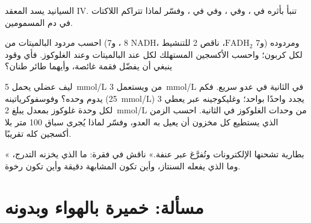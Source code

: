 \begin{exercise}[$\star\star$]\label{exo:b1:respiration-fermentation:9}
السيانيد يسد المعقد IV. تنبأ بأثره في ، وفي ،
وفي  في ، وفسّر لماذا تتراكم اللاكتات في دم
المسمومين.
\end{exercise}

\begin{exercise}[$\star\star\star$]\label{exo:b1:respiration-fermentation:10}
احسب مردود البالميتات من  (8 ، و7 NADH، و7
$\mathrm{FADH_2}$، ناقص 2  للتنشيط) ومردوده لكل كربون؛ واحسب
الأكسجين المستهلك لكل  عند البالميتات وعند الغلوكوز. فأي وقود ينبغي
أن يفضّل فقمة غائصة، وأيهما طائر طنان؟
\end{exercise}

\begin{exercise}[$\star\star\star$]\label{exo:b1:respiration-fermentation:11}
ليف عضلي يحمل \qty{5}{mmol/L} من  ويستعمل \qty{3}{mmol/L} في
الثانية في عدو سريع. فكم يدوم  وحده؟ وفوسفوكرياتينه
(\qty{25}{mmol/L}) يجدد  واحدًا بواحد؛ وغليكوجينه عبر  يعطي
3  لكل وحدة غلوكوز بمعدل يبلغ \qty{2}{mmol/L} من وحدات الغلوكوز
في الثانية. احسب الزمن الذي يستطيع كل مخزون أن يعيل به العدو، وفسّر
لماذا يُجرى سباق 100 متر بلا أكسجين كله تقريبًا.
\end{exercise}

\begin{exercise}[$\star\star\star$]\label{exo:b1:respiration-fermentation:12}
« بطارية تشحنها الإلكترونات وتُفرَّغ عبر عنفة.» ناقش في
فقرة: ما الذي يخزنه التدرج، وما الذي يفعله السنتاز، وأين تكون
المشابهة دقيقة وأين تكون رخوة.
\end{exercise}

\section{مسألة: خميرة بالهواء وبدونه}

